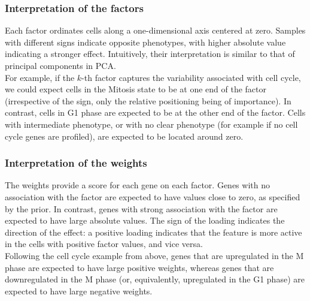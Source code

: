 \subsubsection{Interpretation of the factors} \label{section:interpretation_factors}

Each factor ordinates cells along a one-dimensional axis centered at zero. Samples with different signs indicate opposite phenotypes, with higher absolute value indicating a stronger effect. Intuitively, their interpretation is similar to that of principal components in PCA.\\
For example, if the $k$-th factor captures the variability associated with cell cycle, we could expect cells in the Mitosis state to be at one end of the factor (irrespective of the sign, only the relative positioning being of importance). In contrast, cells in G1 phase are expected to be at the other end of the factor. Cells with intermediate phenotype, or with no clear phenotype (for example if no cell cycle genes are profiled), are expected to be located around zero.


\subsubsection{Interpretation of the weights} \label{section:interpretation_weights}

The weights provide a score for each gene on each factor. Genes with no association with the factor are expected to have values close to zero, as specified by the prior. In contrast, genes with strong association with the factor are expected to have large absolute values. The sign of the loading indicates the direction of the effect: a positive loading indicates that the feature is more active in the cells with positive factor values, and vice versa. \\
Following the cell cycle example from above, genes that are upregulated in the M phase are expected to have large positive weights, whereas genes that are downregulated in the M phase (or, equivalently, upregulated in the G1 phase) are expected to have large negative weights.



